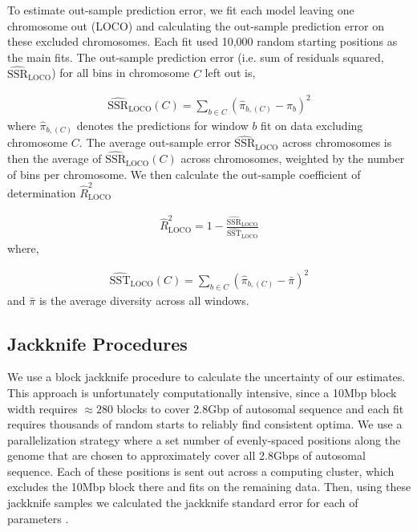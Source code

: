 \documentclass[11pt]{article}
\begin{document}
To estimate out-sample prediction error, we fit each model leaving one
chromosome out (LOCO) and calculating the out-sample prediction error on
these excluded chromosomes. Each fit used 10,000 random starting positions as
the main fits. The out-sample prediction error (i.e. sum of residuals
squared, $\widehat{\mathrm{SSR}}_\text{LOCO}$) for all bins in chromosome $C$
left out is,

\begin{align}
    \widehat{\mathrm{SSR}}_\text{LOCO}(C) = \sum_{b \in C} (\widehat{\pi}_{b, (C)}  - \pi_b)^2
\end{align}
%
where $\widehat{\pi}_{b,(C)}$ denotes the predictions for window $b$ fit on
data excluding chromosome $C$. The average out-sample error
$\widehat{\mathrm{SSR}}_\text{LOCO}$ across chromosomes is then the average of
$\widehat{\mathrm{SSR}}_\text{LOCO}(C)$ across chromosomes, weighted by the
number of bins per chromosome. We then calculate the out-sample coefficient of
determination $\widehat{R}_\text{LOCO}^2$

\begin{align}
    \widehat{R}_\text{LOCO}^2 = 1-\frac{\widehat{\mathrm{SSR}}_\text{LOCO}}{\widehat{\mathrm{SST}}_\text{LOCO}}
\end{align}
%
where, 

\begin{align}
    \widehat{\mathrm{SST}}_\text{LOCO}(C) = \sum_{b \in C} (\widehat{\pi}_{b, (C)}  - \bar{\pi})^2
\end{align}
%
and $\bar{\pi}$ is the average diversity across all windows.

\subsection{Jackknife Procedures}
\label{supp:jackknife}

We use a block jackknife procedure to calculate the uncertainty of our
estimates. This approach is unfortunately computationally intensive, since a
10Mbp block width requires $\approx 280$ blocks to cover 2.8Gbp of autosomal
sequence and each fit requires thousands of random starts to reliably find
consistent optima. We use a parallelization strategy where a set number of
evenly-spaced positions along the genome that are chosen to approximately cover
all 2.8Gbps of autosomal sequence. Each of these positions is sent out across a
computing cluster, which excludes the 10Mbp block there and fits on the
remaining data. Then, using these jackknife samples we calculated the jackknife
standard error for each of parameters \parencite{Wasserman2004-ip}. 
\end{document}
